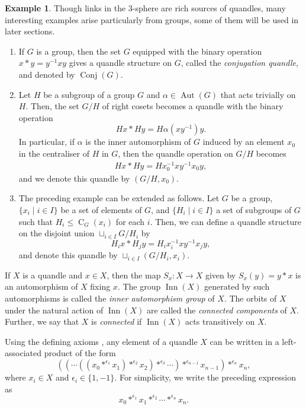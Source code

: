\documentclass[12pt]{amsart}
\theoremstyle{definition}
\newtheorem{example}[theorem]{Example}
\numberwithin{equation}{subsection}
\newcommand{\Aut}{\operatorname{Aut}}
\newcommand{\Conj}{\operatorname{Conj}}
\newcommand{\C}{\operatorname{C}}
\newcommand{\Inn}{\operatorname{Inn}}
\begin{document}
\begin{example}\label{more example quandle}
Though links in the 3-sphere are rich sources of quandles, many interesting examples arise particularly from groups, some of them will be used in later sections.
\begin{enumerate}
\item If $G$ is a group, then the set $G$ equipped with the binary operation $x*y= y^{-1} x y$ gives a quandle structure on $G$, called the {\it conjugation quandle}, and denoted by $\Conj(G)$.
\item Let $H$ be a subgroup of a group $G$ and $\alpha \in \Aut(G)$ that acts trivially on $H$. Then, the set $G/H$ of right cosets becomes a quandle with the binary operation $$Hx \ast Hy= H \alpha(xy^{-1})y.$$  In particular, if $\alpha$ is the inner automorphism of $G$ induced by an element $x_0$ in the centraliser of $H$ in $G$, then the quandle operation on $G/H$ becomes
\begin{align*}
	Hx \ast Hy= H x_{0}^{-1}xy^{-1}x_{0}y,
\end{align*}
and we denote this quandle by $(G/H,x_{0})$.
\item The preceding example can be  extended as follows. Let $G$ be a group, $\{x_i \mid i \in I \}$ be a set of elements of $G$, and $\{H_i \mid i \in I \}$ a set of subgroups of $G$ such that $H_i \le \C_G(x_i)$ for each $i$. Then, we can define a quandle structure on the disjoint union $\sqcup_{i \in I} G/H_i$ by
$$H_ix\ast H_jy=H_ix_i^{-1}xy^{-1}x_jy,$$ 
and denote this quandle by $\sqcup_{i \in I} (G/H_i,x_i ).$
\end{enumerate}
\end{example}
\par


If $X$ is a quandle and $x \in X$, then the map $S_x: X \rightarrow X$ given by $S_x(y)= y \ast x$ is an automorphism of $X$ fixing $x$. The group $\Inn(X)$ generated by such automorphisms is called the {\it inner automorphism group} of $X$. The orbits of $X$ under the natural action of  $\Inn(X)$ are called the {\it connected components} of $X$. Further, we say that $X$ is {\it connected} if $\Inn(X)$ acts transitively on $X$. 
\par 

Using the defining axioms  \cite[Lemma 4.4.7]{MR2634013}, any element of a quandle $X$ can be written in a left-associated product of the form
\begin{equation*}
\left(\left(\cdots\left(\left(x_0*^{\epsilon_1}x_1\right)*^{\epsilon_2}x_2\right)*^{\epsilon_3}\cdots\right)*^{\epsilon_{n-1}}x_{n-1}\right)*^{\epsilon_n}x_n,
\end{equation*}
where $x_i \in X$ and  $\epsilon_i \in \{ 1, -1 \}$. For simplicity, we write the preceding expression as
\begin{equation*}
x_0*^{\epsilon_1}x_1*^{\epsilon_2}\cdots*^{\epsilon_n}x_n.
\end{equation*}
\end{document}
